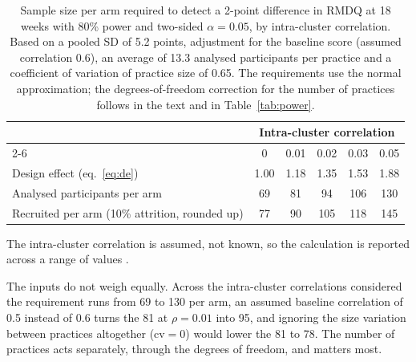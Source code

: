 \documentclass[11pt,a4paper]{article}
\begin{document}
\begin{table}[ht]
\centering\small
\caption{Sample size per arm required to detect a 2-point difference in RMDQ at
18 weeks with 80\% power and two-sided $\alpha = 0.05$, by intra-cluster
correlation. Based on a pooled SD of 5.2 points, adjustment for the baseline
score (assumed correlation 0.6), an average of 13.3 analysed participants per practice and a
coefficient of variation of practice size of 0.65. The requirements use the
normal approximation; the degrees-of-freedom correction for the number of
practices follows in the text and in Table~\ref{tab:power}.}
\label{tab:ss}
\begin{tabular}{lccccc}
\toprule
& \multicolumn{5}{c}{Intra-cluster correlation}\\
\cmidrule(l){2-6}
& 0 & 0.01 & 0.02 & 0.03 & 0.05\\
\midrule
Design effect (eq.~\ref{eq:de}) & 1.00 & 1.18 & 1.35 & 1.53 & 1.88\\
Analysed participants per arm   & 69   & 81   & 94   & 106  & 130\\
Recruited per arm (10\% attrition, rounded up) & 77 & 90 & 105 & 118 & 145\\
\bottomrule
\end{tabular}
\end{table}

The intra-cluster correlation is assumed, not known, so the calculation is
reported across a range of values \citep{hemming2023}.

The inputs do not weigh equally. Across the intra-cluster correlations
considered the requirement runs from 69 to 130 per arm, an assumed baseline
correlation of 0.5 instead of 0.6 turns the 81 at $\rho = 0.01$ into 95,
and ignoring the size variation between practices altogether ($\mathrm{cv} = 0$) would lower the 81 to 78. The number of practices acts separately, through the
degrees of freedom, and matters most.
\end{document}
